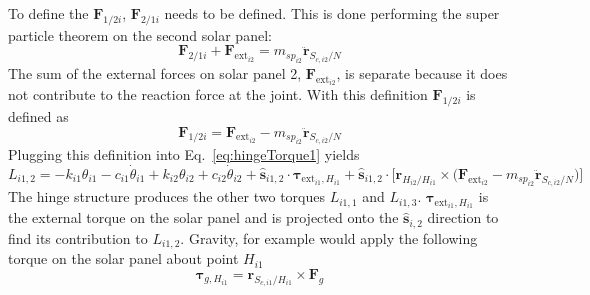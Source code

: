 To define the $\bm F_{1/2i}$, $\bm F_{2/1i}$ needs to be defined. This is done performing the super particle theorem on the second solar panel:
\begin{equation}
	\bm F_{2/1i} + \bm F_{\text{ext}_{i2}} = m_{sp_{i2}} \ddot{\bm{r}}_{S_{c,i2}/N}
\end{equation}
The sum of the external forces on solar panel 2, $\bm F_{\text{ext}_{i2}}$, is separate because it does not contribute to the reaction force at the joint. With this definition $\bm F_{1/2i}$ is defined as
\begin{equation}
	\bm F_{1/2i} = \bm F_{\text{ext}_{i2}}  - m_{sp_{i2}} \ddot{\bm{r}}_{S_{c,i2}/N}
\end{equation}
Plugging this definition into Eq.~\eqref{eq:hingeTorque1} yields
\begin{equation}
	L_{i1,2} = - k_{i1} \theta_{i1} - c_{i1}\dot{\theta}_{i1} +  k_{i2} \theta_{i2} + c_{i2} \dot\theta_{i2} + \hat{\bm s}_{i1,2} \cdot \bm \tau_{\text{ext}_{i1},H_{i1}} + \hat{\bm s}_{i1,2} \cdot \Big[\bm{r}_{H_{i2}/H_{i1}} \times \big(\bm F_{\text{ext}_{i2}}  - m_{sp_{i2}} \ddot{\bm{r}}_{S_{c,i2}/N}\big)\Big]
	\label{eq:hingeTorque2}
\end{equation}
The hinge structure produces the other two torques $L_{i1,1}$ and $L_{i1,3}$. $\bm \tau_{\text{ext}_{i1},H_{i1}}$ is the external torque on the solar panel and is projected onto the $\hat{\bm s}_{i,2}$ direction to find its contribution to $L_{i1,2}$. Gravity, for example would apply the following torque on the solar panel about point $H_{i1}$
\begin{equation}
	\bm \tau_{g,H_{i1}} = \bm r_{S_{c,i1}/H_{i1}} \times \bm F_g
\end{equation}

